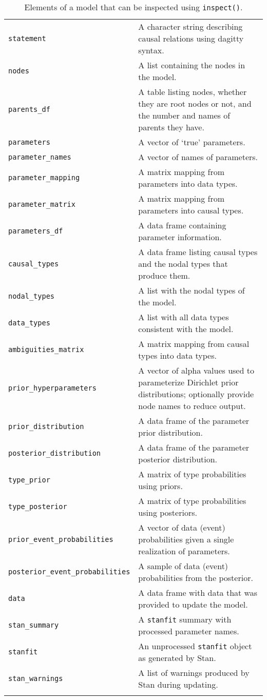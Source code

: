 \begin{longtable}[]{@{}
  >{\raggedright\arraybackslash}p{}
  >{\raggedright\arraybackslash}p{}@{}}
\endhead
\endlastfoot
\texttt{statement} & A character string describing causal relations
using dagitty syntax. \\
\texttt{nodes} & A list containing the nodes in the model. \\
\texttt{parents\_df} & A table listing nodes, whether they are root
nodes or not, and the number and names of parents they have. \\
\texttt{parameters} & A vector of `true' parameters. \\
\texttt{parameter\_names} & A vector of names of parameters. \\
\texttt{parameter\_mapping} & A matrix mapping from parameters into data
types. \\
\texttt{parameter\_matrix} & A matrix mapping from parameters into
causal types. \\
\texttt{parameters\_df} & A data frame containing parameter
information. \\
\texttt{causal\_types} & A data frame listing causal types and the nodal
types that produce them. \\
\texttt{nodal\_types} & A list with the nodal types of the model. \\
\texttt{data\_types} & A list with all data types consistent with the
model. \\
\texttt{ambiguities\_matrix} & A matrix mapping from causal types into
data types. \\
\texttt{prior\_hyperparameters} & A vector of alpha values used to
parameterize Dirichlet prior distributions; optionally provide node
names to reduce output. \\
\texttt{prior\_distribution} & A data frame of the parameter prior
distribution. \\
\texttt{posterior\_distribution} & A data frame of the parameter
posterior distribution. \\
\texttt{type\_prior} & A matrix of type probabilities using priors. \\
\texttt{type\_posterior} & A matrix of type probabilities using
posteriors. \\
\texttt{prior\_event\_probabilities} & A vector of data (event)
probabilities given a single realization of parameters. \\
\texttt{posterior\_event\_probabilities} & A sample of data (event)
probabilities from the posterior. \\
\texttt{data} & A data frame with data that was provided to update the
model. \\
\texttt{stan\_summary} & A \texttt{stanfit} summary with processed
parameter names. \\
\texttt{stanfit} & An unprocessed \texttt{stanfit} object as generated
by Stan. \\
\texttt{stan\_warnings} & A list of warnings produced by Stan during
updating. \\
\bottomrule
\caption{Elements of a model that can be inspected using
\texttt{inspect()}.}\label{tbl-core}\tabularnewline
\end{longtable}
